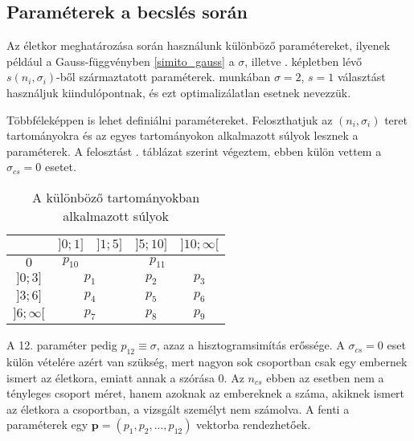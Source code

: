\documentclass[12pt]{article}
\begin{document}
\subsection{Paraméterek a becslés során}
Az életkor meghatározása során használunk különböző paramétereket, ilyenek például a Gauss-függvényben \eqref{simito_gauss} a $\sigma$\iffalse TODO: na jó nem biztos, hogy így szép \fi, illetve . képletben lévő $s(n_i, \sigma_i)$-ből származtatott paraméterek.  munkában $\sigma=2$, $s=1$ választást használjuk kiindulópontnak, és
ezt optimalizálatlan esetnek nevezzük.

Többféleképpen is lehet definiálni paramétereket. Feloszthatjuk az $(n_i, \sigma_i)$ teret \iffalse TODO: vagy mit \fi tartományokra és az egyes tartományokon alkalmazott súlyok lesznek a paraméterek. A felosztást . táblázat szerint végeztem, ebben külön vettem a $\sigma_{cs} = 0$ esetet. %
\begin{table}[H]
	\centering
	\begin{tabular}{|c|c|c|c|c|}
		\hline
		\diagbox{$\sigma_{cs}$}{$n_{cs}$} & $]0;1]$ & $]1;5]$ & $]5;10]$ & $]10;\infty[$  \\
		\hline
		$0$ & $p_{10}$ & \multicolumn{3}{|c|}{$p_{11}$} \\
		\hline
		$]0;3]$ & \multicolumn{2}{|c|}{$p_1$} & $p_2$ & $p_3$ \\
		\hline
		$]3;6]$ & \multicolumn{2}{|c|}{$p_4$} & $p_5$ & $p_6$ \\
		\hline
		$]6;\infty[$  & \multicolumn{2}{|c|}{$p_7$} & $p_8$ & $p_9$ \\
		\hline
	\end{tabular}
	\caption{A különböző tartományokban alkalmazott súlyok}
	\label{felosztas}
\end{table}
\noindent
A 12. paraméter pedig $p_{12} \equiv \sigma$, azaz a hisztogramsimítás erőssége. A $\sigma_{cs} = 0$ eset külön vételére azért van szükség, mert nagyon sok csoportban csak egy embernek ismert az életkora, emiatt annak a szórása $0$. Az $n_{cs}$ ebben az esetben nem a tényleges csoport méret, hanem azoknak az embereknek a száma, akiknek ismert az életkora a csoportban, a vizsgált személyt nem számolva.
A fenti a paraméterek egy $\mathbf{p} = (p_1, p_2, ..., p_{12})$ vektorba rendezhetőek.
\end{document}
